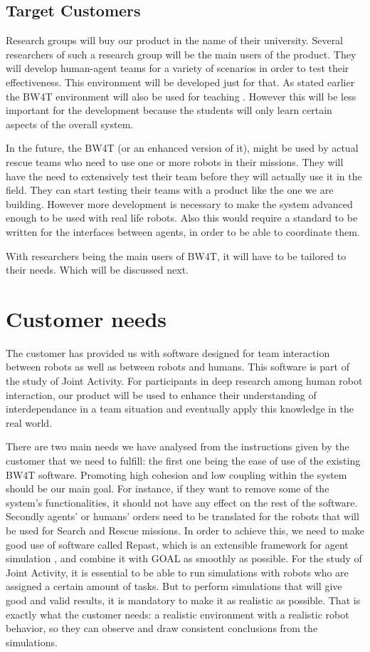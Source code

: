 \documentclass[oneside]{tudelft-report}
\begin{document}
\section{Target Customers}
Research groups will buy our product in the name of their university. Several researchers of such a research group will be the main users of the product. They will develop human-agent teams for a variety of scenarios in order to test their effectiveness. This environment will be developed just for that. As stated earlier the BW4T environment will also be used for teaching \cite{lecture}. However this will be less important for the development because the students will only learn certain aspects of the overall system. 

In the future, the BW4T (or an enhanced version of it), might be used by actual rescue teams who need to use one or more robots in their missions. They will have the need to extensively test their team before they will actually use it in the field. They can start testing their teams with a product like the one we are building. However more development is necessary to make the system advanced enough to be used with real life robots. Also this would require a standard to be written for the interfaces between agents, in order to be able to coordinate them. 

With researchers being the main users of BW4T, it will have to be tailored to their needs. Which will be discussed next.

\chapter{Customer needs}
The customer has provided us with software designed for team interaction between robots as well as between robots and humans. This software is part of the study of Joint Activity. For participants in deep research among human robot interaction, our product will be used to enhance their understanding of interdependance in a team situation and eventually apply this knowledge in the real world.

There are two main needs we have analysed from the instructions given by the customer \cite{context} that we need to fulfill: the first one being the ease of use of the existing BW4T software. Promoting high cohesion and low coupling within the system should be our main goal. For instance, if they want to remove some of the system's functionalities, it should not have any effect on the rest of the software. Secondly agents’ or humans' orders need to be translated for the robots that will be used for Search and Rescue missions. In order to achieve this, we need to make good use of software called Repast, which is an extensible framework for agent simulation \cite{repast}, and combine it with GOAL as smoothly as possible. For the study of Joint Activity, it is essential to be able to run simulations with robots who are assigned a certain amount of tasks. But to perform simulations that will give good and valid results, it is mandatory to make it as realistic as possible. That is exactly what the customer needs: a realistic environment with a realistic robot behavior, so they can observe and draw consistent conclusions from the simulations.
\end{document}
